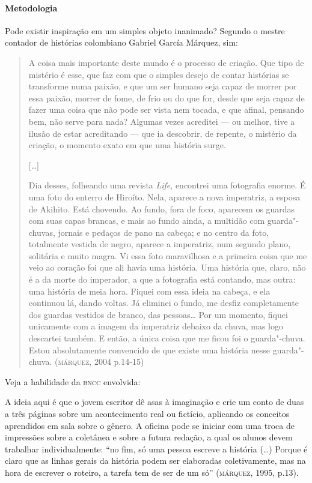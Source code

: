 \documentclass[11pt]{extarticle}
\begin{document}
\paragraph{Metodologia}
Pode existir inspiração em um simples objeto inanimado? Segundo o mestre
contador de histórias colombiano Gabriel García Márquez, sim:

\begin{quote}
A coisa mais importante deste mundo é o processo de criação. Que tipo de
mistério é esse, que faz com que o simples desejo de contar histórias se
transforme numa paixão, e que um ser humano seja capaz de morrer por
essa paixão, morrer de fome, de frio ou do que for, desde que seja capaz
de fazer uma coisa que não pode ser vista nem tocada, e que afinal,
pensando bem, não serve para nada? Algumas vezes acreditei --- ou
melhor, tive a ilusão de estar acreditando --- que ia descobrir, de
repente, o mistério da criação, o momento exato em que uma história
surge.

{[}\ldots{}{]}

Dia desses, folheando uma revista \emph{Life}, encontrei uma fotografia
enorme. É uma foto do enterro de Hiroíto. Nela, aparece a nova
imperatriz, a esposa de Akihito. Está chovendo. Ao fundo, fora de foco,
aparecem os guardas com suas capas brancas, e mais ao fundo ainda, a
multidão com guarda"-chuvas, jornais e pedaços de pano na cabeça; e no
centro da foto, totalmente vestida de negro, aparece a imperatriz, num
segundo plano, solitária e muito magra. Vi essa foto maravilhosa e a
primeira coisa que me veio ao coração foi que ali havia uma história.
Uma história que, claro, não é a da morte do imperador, a que a
fotografia está contando, mas outra: uma história de meia hora. Fiquei
com essa ideia na cabeça, e ela continuou lá, dando voltas. Já eliminei
o fundo, me desfiz completamente dos guardas vestidos de branco, das
pessoas\ldots{} Por um momento, fiquei unicamente com a imagem da imperatriz
debaixo da chuva, mas logo descartei também. E então, a única coisa que
me ficou foi o guarda"-chuva. Estou absolutamente convencido de que
existe uma história nesse guarda"-chuva. (\textsc{márquez}, 2004 p.14-15)
\end{quote}

Veja a habilidade da \textsc{bncc} envolvida:

A ideia aqui é que o jovem escritor dê asas à imaginação e crie um conto
de duas a três páginas sobre um acontecimento real ou fictício,
aplicando os conceitos aprendidos em sala sobre o gênero. A oficina pode
se iniciar com uma troca de impressões sobre a coletânea e sobre a
futura redação, a qual os alunos devem trabalhar individualmente: ``no
fim, só uma pessoa escreve a história (\ldots{}) Porque é claro que as linhas
gerais da história podem ser elaboradas coletivamente, mas na hora de
escrever o roteiro, a tarefa tem de ser de um só'' (\textsc{márquez}, 1995,
p.13).
\end{document}
